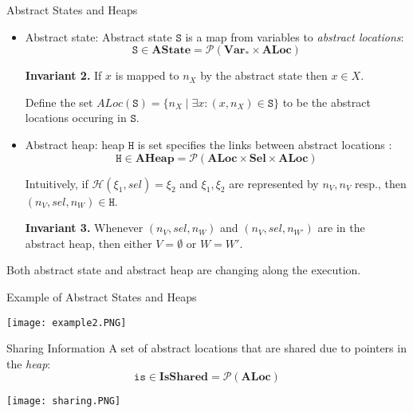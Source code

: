 \documentclass[aspectratio=1610, 13pt]{beamer}
\begin{document}
\begin{frame}{Abstract States and Heaps}
\begin{itemize}
    \item Abstract state:
    Abstract state $\texttt{S}$ is a map from variables to \emph{abstract locations}: 
            \[\texttt{S}\in \mathbf{AState} = \mathcal{P}\mathbf{(Var_*\times ALoc)}\]
            
    \textbf{Invariant 2.} If $x$ is mapped to $n_X$ by the abstract state then $x\in X$.
    \vspace{1em}
    
    Define the set $ALoc(\texttt{S}) = \{n_X\mid \exists x : (x, n_X)\in \texttt{S}\}$ to be the abstract locations occuring in $\texttt{S}$.
    
    
    \item Abstract heap:  heap $\texttt{H}$ is set specifies the links between abstract locations : 
            \[\texttt{H}\in \mathbf{AHeap} = \mathcal{P}\mathbf{(ALoc \times Sel\times ALoc)}\]
            
    Intuitively, if $\mathcal{H}(\xi_1, sel) = \xi_2 $ and $\xi_1, \xi_2$ are represented by $n_V, n_V$ resp., then $(n_V, sel, n_W)\in \texttt{H}$.
    
      \vspace{1em}
    \textbf{Invariant 3.} Whenever $(n_V, sel, n_W)$ and $(n_V, sel, n_{W'})$ are in the abstract heap, then either $V = \emptyset$ or $W = W'$.
\end{itemize}
Both abstract state and abstract heap are changing along the execution.
\end{frame}

\begin{frame}{Example of Abstract States and Heaps}
    \begin{center}
        \texttt{[image: example2.PNG]}\end{center}
\end{frame}

\begin{frame}{Sharing Information}
    A set of abstract locations that are shared due to pointers in the \emph{heap}: 
            \[\texttt{is} \in \mathbf{IsShared} = \mathcal{P}\mathbf{(ALoc)}\]
    \begin{center}
        \texttt{[image: sharing.PNG]}
    \end{center}
            
\end{frame}
\end{document}
